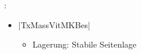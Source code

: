 
\label{m:hyperglykaemisches-koma}
: 

\begin{itemize}
  \item |TxMassVitMKBes|
  \begin{itemize}
    \item Lagerung: Stabile Seitenlage
  \end{itemize}
\end{itemize}